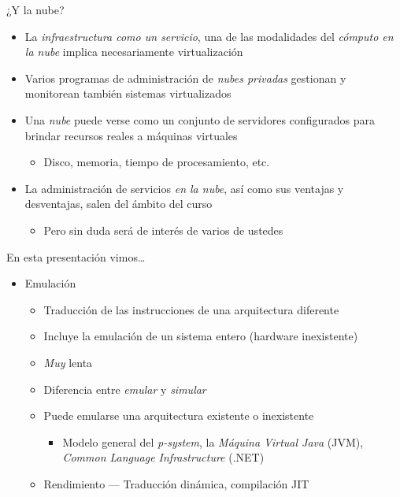 \documentclass[presentation]{beamer}
\begin{document}
\begin{frame}[label={sec:org0fc5808}]{¿Y la nube?}
\begin{itemize}
\item La \emph{infraestructura como un servicio}, una de las modalidades del
\emph{cómputo en la nube} implica necesariamente virtualización
\item Varios programas de administración de \emph{nubes privadas} gestionan y
monitorean también sistemas virtualizados
\item Una \emph{nube} puede verse como un conjunto de servidores configurados
para brindar recursos reales a máquinas virtuales
\begin{itemize}
\item Disco, memoria, tiempo de procesamiento, etc.
\end{itemize}
\item La administración de servicios \emph{en la nube}, así como sus ventajas y
desventajas, salen del ámbito del curso
\begin{itemize}
\item Pero sin duda será de interés de varios de ustedes
\end{itemize}
\end{itemize}
\end{frame}

\begin{frame}[label={sec:orgbf97efa}]{En esta presentación vimos\ldots{}}
\begin{itemize}
\item Emulación
\begin{itemize}
\item Traducción de las instrucciones de una arquitectura diferente
\item Incluye la emulación de un sistema entero (hardware inexistente)
\item \emph{Muy} lenta
\item Diferencia entre \emph{emular} y \emph{simular}
\item Puede emularse una arquitectura existente o inexistente
\begin{itemize}
\item Modelo general del \emph{p-system}, la \emph{Máquina Virtual Java} (JVM),
\emph{Common Language Infrastructure} (.NET)
\end{itemize}
\item Rendimiento — Traducción dinámica, compilación JIT
\end{itemize}
\end{itemize}
\end{frame}
\end{document}
